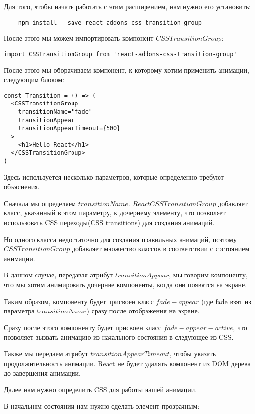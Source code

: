 Для того, чтобы начать работать с этим расширением, нам нужно его установить:

\begin{lstlisting}
	npm install --save react-addons-css-transition-group
\end{lstlisting}

После этого мы можем импортировать компонент $CSSTransitionGroup$:

\begin{lstlisting}
import CSSTransitionGroup from 'react-addons-css-transition-group'
\end{lstlisting}

После этого мы оборачиваем компонент, к которому хотим применить анимации, следующим блоком:

\begin{lstlisting}
const Transition = () => (
  <CSSTransitionGroup
    transitionName="fade"
    transitionAppear
    transitionAppearTimeout={500}
  >
    <h1>Hello React</h1>
  </CSSTransitionGroup>
)
\end{lstlisting}

Здесь используется несколько параметров, которые определенно требуют объяснения.

Сначала мы определяем $transitionName$. $ReactCSSTransitionGroup$ добавляет класс, указанный в этом параметру, к дочернему элементу, что позволяет использовать CSS переходы(CSS transitions) для создания анимаций.

Но одного класса недостаточно для создания правильных анимаций, поэтому $CSSTransitionGroup$ добавляет множество классов в соответствии с состоянием анимации.

В данном случае, передавая атрибут $transitionAppear$, мы говорим компоненту, что мы хотим анимировать дочерние компоненты, когда они появятся на экране.

Таким образом, компоненту будет присвоен класс $fade-appear$ (где fade взят из параметра $transitionName$) сразу после отображения на экране.

Сразу после этого компоненту будет присвоен класс $fade-appear-active$, что позволяет вызвать анимацию из начального состояния в следующее из CSS.

Также мы передаем атрибут $transitionAppearTimeout$, чтобы указать продолжительность анимации. React не будет удалять компонент из DOM дерева до завершения анимации.

Далее нам нужно определить CSS для работы нашей анимации.

В начальном состоянии нам нужно сделать элемент прозрачным:

